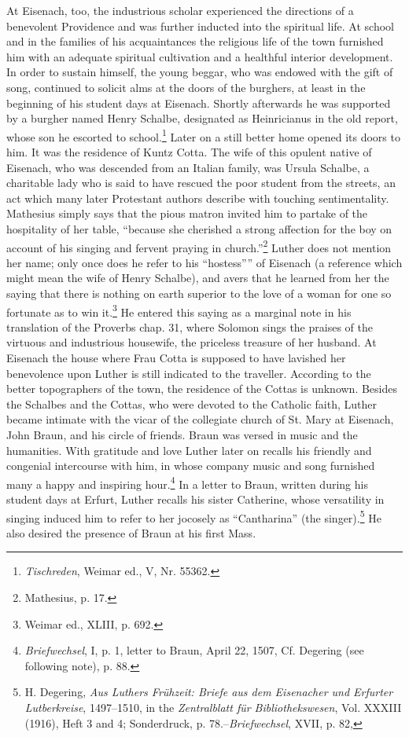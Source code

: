 At Eisenach, too, the industrious scholar experienced the directions
of a benevolent Providence and was further inducted into the spiritual life. At school and in the families of his acquaintances the religious
life of the town furnished him with an adequate spiritual cultivation
and a healthful interior development. In order to sustain himself, the
young beggar, who was endowed with the gift of song, continued to
solicit alms at the doors of the burghers, at least in the beginning of
his student days at Eisenach. Shortly afterwards he was supported by
a burgher named Henry Schalbe, designated as Heinricianus in the
old report, whose son he escorted to school.\footnote{\textit{Tischreden}, Weimar ed., V, Nr. 55362.}
Later on a still better
home opened its doors to him. It was the residence of Kuntz Cotta.
The wife of this opulent native of Eisenach, who was descended from
an Italian family, was Ursula Schalbe, a charitable lady who is said
to have rescued the poor student from the streets, an act which many
later Protestant authors describe with touching sentimentality. Mathesius simply says that the pious matron invited him to partake of the
hospitality of her table, “because she cherished a strong affection for
the boy on account of his singing and fervent praying in church.”\footnote
{Mathesius, p. 17.}
Luther does not mention her name; only once does he refer to his
“hostess”” of Eisenach (a reference which might mean the wife of
Henry Schalbe), and avers that he learned from her the saying that
there is nothing on earth superior to the love of a woman for one so
fortunate as to win it.\footnote{Weimar ed., XLIII, p. 692.}
He entered this saying as a marginal note in
his translation of the Proverbs chap. 31, where Solomon sings the
praises of the virtuous and industrious housewife, the priceless treasure of her husband.
At Eisenach the house where Frau Cotta is supposed
to have lavished her benevolence upon Luther is still indicated
to the traveller. According to the better topographers of the town, the
residence of the Cottas is unknown.
Besides the Schalbes and the Cottas, who were devoted to the
Catholic faith, Luther became intimate with the vicar of the collegiate
church of St. Mary at Eisenach, John Braun, and his circle of friends.
Braun was versed in music and the humanities. With gratitude and
love Luther later on recalls his friendly and congenial intercourse with
him, in whose company music and song furnished many a happy and
inspiring hour.\footnote{\textit{Briefwechsel}, I, p. 1, letter to Braun, April 22, 1507, Cf. Degering (see following note), p. 88.}
In a letter to Braun, written during his student
days at Erfurt, Luther recalls his sister Catherine, whose versatility
in singing induced him to refer to her jocosely as “Cantharina”
(the singer).\footnote{H. Degering, \textit{Aus Luthers Frühzeit: Briefe aus dem Eisenacher und Erfurter Lutberkreise}, 1497--1510, in the \textit{Zentralblatt für Bibliothekswesen}, Vol. XXXIII (1916), Heft 3 and 4; Sonderdruck, p. 78.--\textit{Briefwechsel}, XVII, p. 82,}
He also desired the presence of Braun at his first Mass.

